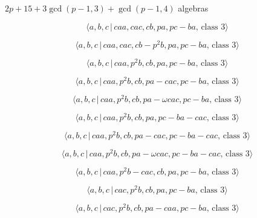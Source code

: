 \documentclass[10pt]{article}
\begin{document}
$2p+15+3\gcd (p-1,3)+\gcd (p-1,4)$ algebras

\begin{equation}
\langle a,b,c\,|\,caa,cac,cb,pa,pc-ba,\,\text{class }3\rangle  \tag{7.2833}
\end{equation}

\begin{equation}
\langle a,b,c\,|\,caa,cac,cb-p^2b,pa,pc-ba,\,\text{class }3\rangle 
\tag{7.2834}
\end{equation}

\begin{equation}
\langle a,b,c\,|\,caa,p^2b,cb,pa,pc-ba,\,\text{class }3\rangle  \tag{7.2835}
\end{equation}

\begin{equation}
\langle a,b,c\,|\,caa,p^2b,cb,pa-cac,pc-ba,\,\text{class }3\rangle 
\tag{7.2836}
\end{equation}

\begin{equation}
\langle a,b,c\,|\,caa,p^{2}b,cb,pa-\omega cac,pc-ba,\,\text{class }3\rangle 
\tag{7.2837}
\end{equation}

\begin{equation}
\langle a,b,c\,|\,caa,p^2b,cb,pa,pc-ba-cac,\,\text{class }3\rangle 
\tag{7.2838}
\end{equation}

\begin{equation}
\langle a,b,c\,|\,caa,p^2b,cb,pa-cac,pc-ba-cac,\,\text{class }3\rangle 
\tag{7.2839}
\end{equation}

\begin{equation}
\langle a,b,c\,|\,caa,p^{2}b,cb,pa-\omega cac,pc-ba-cac,\,\text{class }%
3\rangle  \tag{7.2840}
\end{equation}

\begin{equation}
\langle a,b,c\,|\,caa,p^2b-cac,cb,pa,pc-ba,\,\text{class }3\rangle 
\tag{7.2841}
\end{equation}

\begin{equation}
\langle a,b,c\,|\,cac,p^2b,cb,pa,pc-ba,\,\text{class }3\rangle  \tag{7.2842}
\end{equation}

\begin{equation}
\langle a,b,c\,|\,cac,p^2b,cb,pa-caa,pc-ba,\,\text{class }3\rangle 
\tag{7.2843}
\end{equation}
\end{document}
